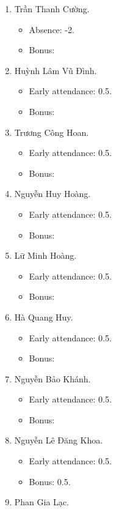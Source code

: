\documentclass{article}
\begin{document}
\begin{enumerate}
	\item {\sc Trần Thanh Cường.}
	\begin{itemize}
		\item Absence: -2.
		\item Bonus: 
	\end{itemize}
	\item {\sc Huỳnh Lâm Vũ Đình.}
	\begin{itemize}
		\item Early attendance: 0.5.
		\item Bonus: 
	\end{itemize}
	\item {\sc Trương Công Hoan.}
	\begin{itemize}
		\item Early attendance: 0.5.
		\item Bonus: 
	\end{itemize}
	\item {\sc Nguyễn Huy Hoàng.}
	\begin{itemize}
		\item Early attendance: 0.5.
		\item Bonus: 
	\end{itemize}
	\item {\sc Lữ Minh Hoàng.}
	\begin{itemize}
		\item Early attendance: 0.5.
		\item Bonus: 
	\end{itemize}
	\item {\sc Hà Quang Huy.}
	\begin{itemize}
		\item Early attendance: 0.5.
		\item Bonus: 
	\end{itemize}
	\item {\sc Nguyễn Bảo Khánh.}
	\begin{itemize}
		\item Early attendance: 0.5.
		\item Bonus: 
	\end{itemize}
	\item {\sc Nguyễn Lê Đăng Khoa.}
	\begin{itemize}
		\item Early attendance: 0.5.
		\item Bonus: 0.5.
	\end{itemize}
	\item {\sc Phan Gia Lạc.}
	\begin{itemize}

\end{itemize}
\end{enumerate}
\end{document}
